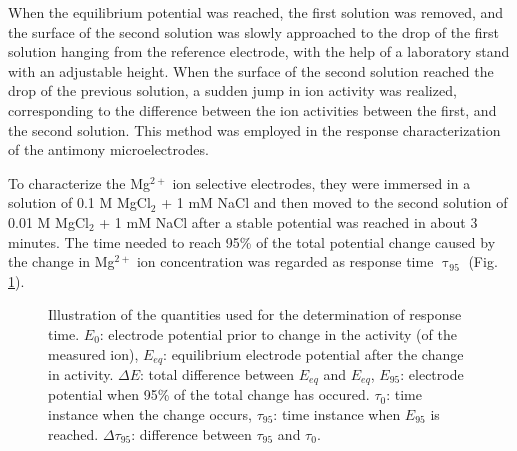 When the equilibrium potential was reached, the first solution was removed, and the surface of the second solution was slowly approached to the drop of the first solution hanging from the reference electrode, with the help of a laboratory stand with an adjustable height. When the surface of the second solution reached the drop of the previous solution, a sudden jump in ion activity was realized, corresponding to the difference between the ion activities between the first, and the second solution. This method was employed in the response characterization of the antimony microelectrodes.

To characterize the Mg$^{2+}$ ion selective electrodes, they were immersed in a solution of 0.1 M MgCl$_2$ + 1 mM NaCl and then moved to the second solution of 0.01 M MgCl$_2$ + 1 mM NaCl after a stable potential was reached in about 3 minutes.
The time needed to reach 95\% of the total potential change caused by the change in Mg$^{2+}$ ion concentration was regarded as response time $\uptau_{95}$ (Fig. \ref{fig:response_time_explained}).

\begin{figure}
\centering
{}
\caption[Illustration of the parameters used for the determination of response time.]{Illustration of the quantities used for the determination of response time.
$E_0$: electrode potential prior to change in the activity (of the measured ion), $E_{eq}$: equilibrium electrode potential after the change in activity.
$\Delta E$: total difference between $E_{eq}$ and $E_{eq}$, $E_{95}$: electrode potential when 95\% of the total change has occured.
$\tau_0$: time instance when the change occurs, $\tau_{95}$: time instance when $E_{95}$ is reached.
$\Delta \tau_{95}$: difference between $\tau_{95}$ and $\tau_0$.}
\label{fig:response_time_explained}
\end{figure}

